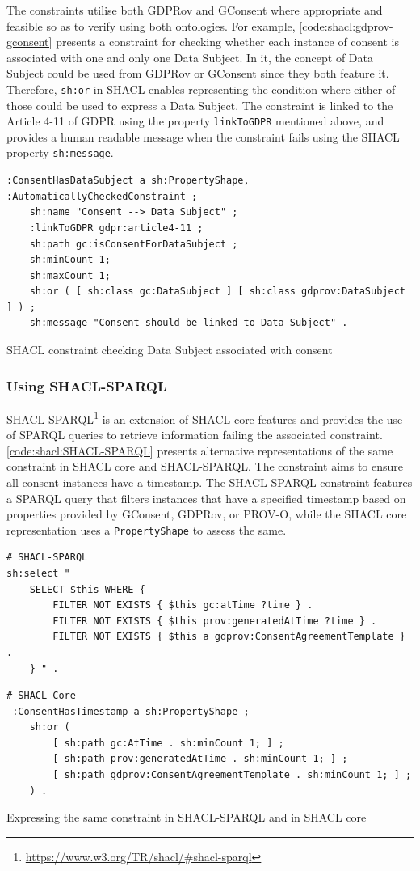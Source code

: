 The constraints utilise both GDPRov and GConsent where appropriate and feasible so as to verify using both ontologies. For example, \autoref{code:shacl:gdprov-gconsent} presents a constraint for checking whether each instance of consent is associated with one and only one Data Subject. In it, the concept of Data Subject could be used from GDPRov or GConsent since they both feature it. Therefore, \texttt{sh:or} in SHACL enables representing the condition where either of those could be used to express a Data Subject.
The constraint is linked to the Article 4-11 of GDPR using the property \texttt{linkToGDPR} mentioned above, and provides a human readable message when the constraint fails using the SHACL property \texttt{sh:message}.
\begin{listing}[htbp]
\begin{verbatim}
:ConsentHasDataSubject a sh:PropertyShape, :AutomaticallyCheckedConstraint ;
    sh:name "Consent --> Data Subject" ;
    :linkToGDPR gdpr:article4-11 ;
    sh:path gc:isConsentForDataSubject ;
    sh:minCount 1;
    sh:maxCount 1;
    sh:or ( [ sh:class gc:DataSubject ] [ sh:class gdprov:DataSubject ] ) ;
    sh:message "Consent should be linked to Data Subject" .
\end{verbatim}
\caption{SHACL constraint checking Data Subject associated with consent}
\label{code:shacl:gdprov-gconsent}
\end{listing}

\subsubsection{Using SHACL-SPARQL}

SHACL-SPARQL\footnote{\url{https://www.w3.org/TR/shacl/\#shacl-sparql}} is an extension of SHACL core features and provides the use of SPARQL queries to retrieve information failing the associated constraint. \autoref{code:shacl:SHACL-SPARQL} presents alternative representations of the same constraint in SHACL core and SHACL-SPARQL.
The constraint aims to ensure all consent instances have a timestamp.
The SHACL-SPARQL constraint features a SPARQL query that filters instances that have a specified timestamp based on properties provided by GConsent, GDPRov, or PROV-O, while the SHACL core representation uses a \texttt{PropertyShape} to assess the same.
\begin{listing}[htbp]
\begin{verbatim}
# SHACL-SPARQL
sh:select "
    SELECT $this WHERE {
        FILTER NOT EXISTS { $this gc:atTime ?time } .
        FILTER NOT EXISTS { $this prov:generatedAtTime ?time } .
        FILTER NOT EXISTS { $this a gdprov:ConsentAgreementTemplate } .
    } " .
\end{verbatim}
\begin{verbatim}
# SHACL Core
_:ConsentHasTimestamp a sh:PropertyShape ;
    sh:or (
        [ sh:path gc:AtTime . sh:minCount 1; ] ;
        [ sh:path prov:generatedAtTime . sh:minCount 1; ] ;
        [ sh:path gdprov:ConsentAgreementTemplate . sh:minCount 1; ] ;
    ) .
\end{verbatim}
\caption{Expressing the same constraint in SHACL-SPARQL and in SHACL core}
\label{code:shacl:SHACL-SPARQL}
\end{listing}

